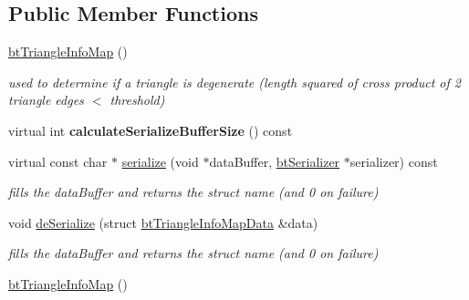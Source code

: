 \subsection*{Public Member Functions}
\begin{DoxyCompactItemize}
\item 
\mbox{\label{structbtTriangleInfoMap_a60e9096e47e52a03e29004e77d9dd572}} 
\hyperlink{structbtTriangleInfoMap_a60e9096e47e52a03e29004e77d9dd572}{bt\+Triangle\+Info\+Map} ()
\begin{DoxyCompactList}\small\item\em used to determine if a triangle is degenerate (length squared of cross product of 2 triangle edges $<$ threshold) \end{DoxyCompactList}\item 
\mbox{\label{structbtTriangleInfoMap_a41b97746654d67667101d7c0e14c83a8}} 
virtual int {\bfseries calculate\+Serialize\+Buffer\+Size} () const
\item 
\mbox{\label{structbtTriangleInfoMap_a261e882097348fb47cc787bcdf6e1420}} 
virtual const char $\ast$ \hyperlink{structbtTriangleInfoMap_a261e882097348fb47cc787bcdf6e1420}{serialize} (void $\ast$data\+Buffer, \hyperlink{classbtSerializer}{bt\+Serializer} $\ast$serializer) const
\begin{DoxyCompactList}\small\item\em fills the data\+Buffer and returns the struct name (and 0 on failure) \end{DoxyCompactList}\item 
\mbox{\label{structbtTriangleInfoMap_a729483561a5100a27dae3f92fe57ebca}} 
void \hyperlink{structbtTriangleInfoMap_a729483561a5100a27dae3f92fe57ebca}{de\+Serialize} (struct \hyperlink{structbtTriangleInfoMapData}{bt\+Triangle\+Info\+Map\+Data} \&data)
\begin{DoxyCompactList}\small\item\em fills the data\+Buffer and returns the struct name (and 0 on failure) \end{DoxyCompactList}\item 
\mbox{\label{structbtTriangleInfoMap_a60e9096e47e52a03e29004e77d9dd572}} 
\hyperlink{structbtTriangleInfoMap_a60e9096e47e52a03e29004e77d9dd572}{bt\+Triangle\+Info\+Map} ()

\end{DoxyCompactItemize}
